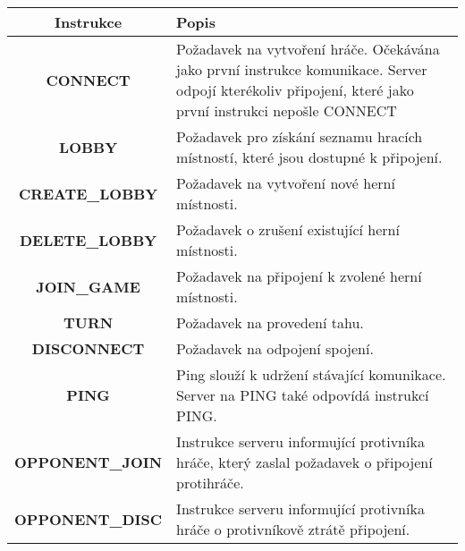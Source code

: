 \documentclass[12pt]{report}
\begin{document}
\begin{table}[H]
\begin{tabularx}{\textwidth}{|c|X|}
\hline
\textbf{Instrukce}      & \textbf{Popis}                                                                                                                                          \\ \hline
\textbf{CONNECT}        & Požadavek na vytvoření hráče. Očekávána jako první instrukce komunikace. Server odpojí kterékoliv připojení, které jako první instrukci nepošle CONNECT \\ \hline
\textbf{LOBBY}          & Požadavek pro získání seznamu hracích místností, které jsou dostupné k připojení.                                                                       \\ \hline
\textbf{CREATE\_LOBBY}  & Požadavek na vytvoření nové herní místnosti.                                                                                                            \\ \hline
\textbf{DELETE\_LOBBY}  & Požadavek o zrušení existující herní místnosti.                                                                                                         \\ \hline
\textbf{JOIN\_GAME}     & Požadavek na připojení k zvolené herní místnosti.                                                                                                       \\ \hline
\textbf{TURN}           & Požadavek na provedení tahu.                                                                                                                            \\ \hline
\textbf{DISCONNECT}     & Požadavek na odpojení spojení.                                                                                                                          \\ \hline
\textbf{PING}           & Ping slouží k udržení stávající komunikace. Server na PING také odpovídá instrukcí PING.                                                                \\ \hline
\textbf{OPPONENT\_JOIN} & Instrukce serveru informující protivníka hráče, který zaslal požadavek o připojení protihráče.                                                          \\ \hline
\textbf{OPPONENT\_DISC} & Instrukce serveru informující protivníka hráče o protivníkově ztrátě připojení.                                                                          \\ \hline

\end{tabularx}
\end{table}
\end{document}
